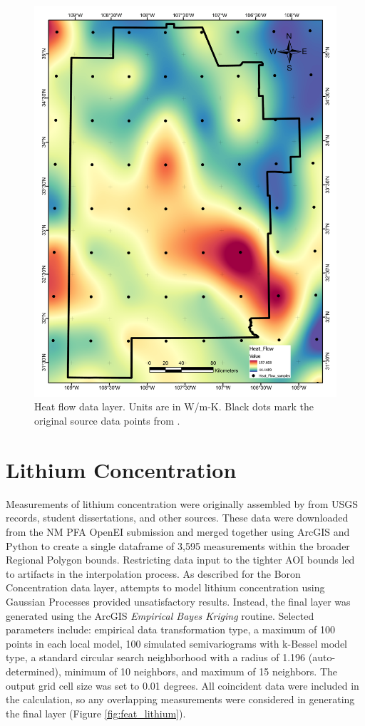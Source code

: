 \begin{figure}[H]
\centering
\includegraphics[width=0.75\linewidth]{templates/images/Figure-HeatFlow.pdf}
\caption[Heat flow data layer]{Heat flow data layer. Units are in W/m-K. Black dots mark the original source data points from \protect\citep{lucazeau_analysis_2019}.}
\label{fig:feat_heatflow}
\end{figure}
\pagebreak

\section{Lithium Concentration}\label{app:dl_lithium}
Measurements of lithium concentration were originally assembled by \citet{bielicki_hydrogeolgic_2015} from USGS records, student dissertations, and other sources. These data were downloaded from the NM PFA OpenEI submission \citep{kelley_geothermal_2015} and merged together using ArcGIS and Python to create a single dataframe of 3,595 measurements within the broader Regional Polygon bounds. Restricting data input to the tighter AOI bounds led to artifacts in the interpolation process. As described for the Boron Concentration data layer, attempts to model lithium concentration using Gaussian Processes provided unsatisfactory results. Instead, the final layer was generated using the ArcGIS \textit{Empirical Bayes Kriging} routine. Selected parameters include: empirical data transformation type, a maximum of 100 points in each local model, 100 simulated semivariograms with k-Bessel model type, a standard circular search neighborhood with a radius of 1.196 (auto-determined), minimum of 10 neighbors, and maximum of 15 neighbors. The output grid cell size was set to 0.01 degrees. All coincident data were included in the calculation, so any overlapping measurements were considered in generating the final layer (Figure \ref{fig:feat_lithium}).
\vfill
\pagebreak

